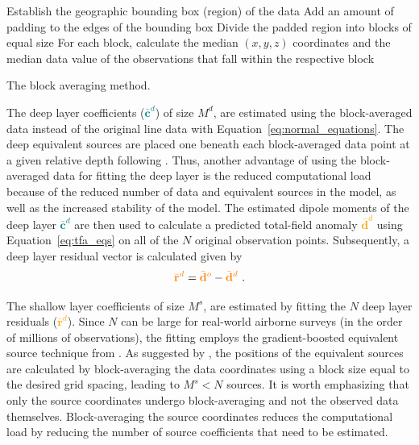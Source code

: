 \begin{algorithm}[!h]
  Establish the geographic bounding box (region) of the data
  \;
  Add an amount of padding to the edges of the bounding box
  \;
  Divide the padded region into blocks of equal size
  \;
  For each block, calculate the median $(x, y, z)$ coordinates and the median data value of the observations that fall within the respective block
  \;
  \BlankLine
  \caption{The block averaging method.}
  \label{alg:block_averaging}
\end{algorithm}


The deep layer coefficients (\textcolor{teal}{$\bar{\mathbf{c}}^d$}) of size $M^d$, are estimated using the block-averaged data instead of the original line data with Equation~\ref{eq:normal_equations}. The deep equivalent sources are placed one beneath each block-averaged data point at a given relative depth following \citet{Soler2021}. Thus, another advantage of using the block-averaged data for fitting the deep layer is the reduced computational load because of the reduced number of data and equivalent sources in the model, as well as the increased stability of the model. The estimated dipole moments of the deep layer \textcolor{teal}{$\bar{\mathbf{c}}^d$} are then used to calculate a predicted total-field anomaly \textcolor{orange}{$\bar{\mathbf{d}}^d$} using Equation~\ref{eq:tfa_eqs} on all of the $N$ original observation points.
Subsequently, a deep layer residual vector is calculated given by
\begin{equation}
    \textcolor{orange}{\bar{\mathbf{r}}^d} = \textcolor{orange}{\bar{\mathbf{d}}^o} - \textcolor{orange}{\bar{\mathbf{d}}^d}
    \ .
    \label{eq:deep_residual}
\end{equation}

The shallow layer coefficients of size $M^s$, are estimated by fitting the $N$ deep layer residuals (\textcolor{orange}{$\bar{\mathbf{r}}^d$}). Since $N$ can be large for real-world airborne surveys (in the order of millions of observations), the fitting employs the gradient-boosted equivalent source technique from \citet{Soler2021}. As suggested by \citet{Soler2021}, the positions of the equivalent sources are calculated by block-averaging the data coordinates using a block size equal to the desired grid spacing, leading to $M^s < N$ sources. It is worth emphasizing that only the source coordinates undergo block-averaging and not the observed data themselves. Block-averaging the source coordinates reduces the computational load by reducing the number of source coefficients that need to be estimated.

